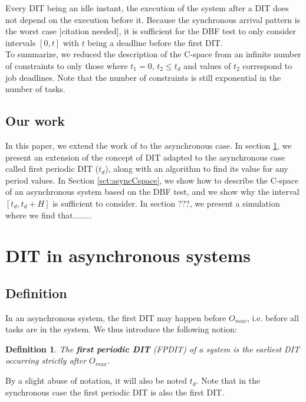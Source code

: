 \documentclass[times, 10pt,twocolumn, a4paper]{article}
\newtheorem{definition}{Definition}
\begin{document}
	Every DIT being an idle instant, the execution of the system after a DIT does
	not depend on the execution before it. Because the synchronous arrival pattern is
	the worst case [citation needed], it is sufficient for the DBF test to only
	consider intervals $[0, t]$ with $t$ being a deadline before the first DIT.\\

	To summarize, we reduced the description of the C-space from an infinite number
	of constraints to only those where $t_1 = 0$, $t_2 \leqslant t_d$ and
	values of $t_2$ correspond to job deadlines. Note that the number of
	constraints is still exponential in the number of tasks.

	\subsection{Our work}
		In this paper, we extend the work of \cite{george2009characterization} to the
		asynchronous case. In section \ref{sct:asyncDIT}, we present an extension of
		the concept of DIT adapted to the asynchronous case called first periodic DIT
		($t_d$), along with an algorithm to find its value for any period values. In Section
		\ref{sct:asyncCspace}, we show how to describe the C-space of an asynchronous
		system based on the DBF test, and we show why the interval $[t_d, t_d + H]$ is
		sufficient to consider. In section ???, we present a simulation where we find that........

\section{DIT in asynchronous systems}
	\label{sct:asyncDIT}

	\subsection{Definition}

		In an asynchronous system, the first DIT may happen before $O_{max}$, i.e. before all tasks are in the system. We thus introduce the following notion:

		\begin{definition}
			The \textbf{first periodic DIT} (FPDIT) of a system is the earliest DIT occurring
			strictly after $O_{max}$.
		\end{definition}

		By a slight abuse of notation, it will also be noted $t_d$. Note that in the
		synchronous case the first periodic DIT is also the first DIT.
\end{document}
